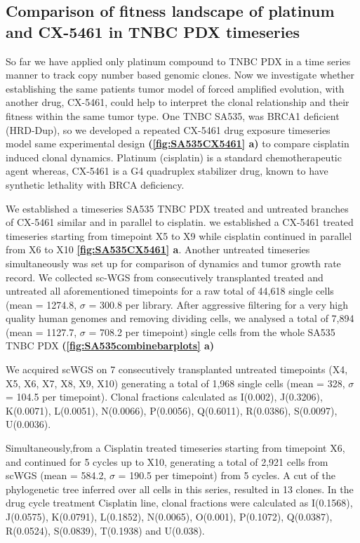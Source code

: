 \subsection{Comparison of fitness landscape of platinum and CX-5461 in TNBC PDX timeseries}
So far we have applied only platinum compound to TNBC PDX in a time series manner to track copy number based genomic clones. Now we investigate whether establishing the same patients tumor model of forced amplified evolution, with another drug, CX-5461, could help to interpret the clonal relationship and their fitness within the same tumor type.
One TNBC SA535, was BRCA1 deficient (HRD-Dup), so we developed a repeated CX-5461 drug exposure timeseries model same experimental design \textbf{(\autoref{fig:SA535CX5461} a)} to compare cisplatin induced clonal dynamics. Platinum (cisplatin) is a standard chemotherapeutic agent whereas, CX-5461 is a G4 quadruplex stabilizer drug, known to have synthetic lethality with BRCA deficiency.

We established a timeseries SA535 TNBC PDX treated and untreated branches of CX-5461 similar and in parallel to cisplatin.
we established a CX-5461 treated timeseries starting from timepoint X5 to X9 while cisplatin continued in parallel from X6 to X10  \textbf{\autoref{fig:SA535CX5461} a}. Another untreated timeseries simultaneously was set up for comparison of dynamics and tumor growth rate record.
We collected sc-WGS from consecutively transplanted treated and untreated all aforementioned timepoints for a raw total of 44,618 single cells (mean = 1274.8, $\sigma$ = 300.8 per library. After aggressive filtering for a very high quality human genomes and removing dividing cells, we analysed a total of 7,894 (mean = 1127.7, $\sigma$ = 708.2 per timepoint) single cells from the whole SA535 TNBC PDX \textbf{(\autoref{fig:SA535combinebarplots} a)}

We acquired scWGS on 7 consecutively transplanted untreated timepoints (X4, X5, X6, X7, X8, X9, X10) generating a total of 1,968 single cells (mean = 328, $\sigma$ = 104.5 per timepoint).
Clonal fractions calculated as I(0.002), J(0.3206), K(0.0071), L(0.0051), N(0.0066), P(0.0056), Q(0.6011), R(0.0386), S(0.0097), U(0.0036). 

Simultaneously,from a Cisplatin treated timeseries starting from timepoint X6, and continued for 5 cycles up to X10, generating a total of 2,921 cells from scWGS (mean = 584.2, $\sigma$ = 190.5 per timepoint) from 5 cycles. A cut of the phylogenetic tree inferred over all cells in this series, resulted in 13 clones.
In the drug cycle treatment Cisplatin line, clonal fractions were
calculated as I(0.1568), J(0.0575), K(0.0791), L(0.1852), N(0.0065), O(0.001), P(0.1072), Q(0.0387), R(0.0524), S(0.0839), T(0.1938) and U(0.038).

